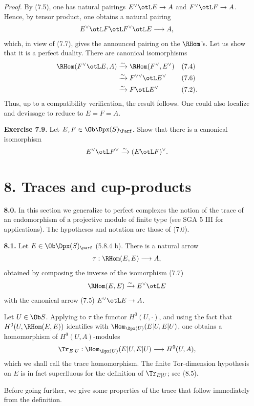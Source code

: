 \emph{Proof.} By (7.5), one has natural pairings \(E^\vee\otL E\to A\) and \(F^\vee\otL F\to A\). Hence, by tensor product, one obtains a natural pairing
\[
  E^\vee\otL F\otL F^\vee\otL E\longrightarrow A,
\]
which, in view of (7.7), gives the announced pairing on the \(\RHom\)'s. Let us show that it is a perfect duality. There are canonical isomorphisms
\[
\begin{aligned}
\RHom(F^\vee\otL E,A)&\xrightarrow{\sim}\RHom(F^\vee,E^\vee) &&(7.4)\\
&\xrightarrow{\sim} F^{\vee\vee}\otL E^\vee &&(7.6)\\
&\xrightarrow{\sim} F\otL E^\vee &&(7.2).
\end{aligned}
\]
Thus, up to a compatibility verification, the result follows. One could also localize and devissage to reduce to \(E=F=A\).


\textbf{Exercise 7.9.} Let \(E,F\in\Ob\Dpx(S)_{\Parf}\). Show that there is a canonical isomorphism
\[
  E^\vee\otL F^\vee \xrightarrow{\sim} (E\otL F)^\vee .
\]

\section*{8. Traces and cup-products}

\textbf{8.0.} In this section we generalize to perfect complexes the notion of the trace of an endomorphism of a projective module of finite type (see SGA 5 III for applications). The hypotheses and notation are those of (7.0).

\textbf{8.1.} Let \(E\in\Ob\Dpx(S)_{\parf}\) (5.8.4 b). There is a natural arrow
\[
  \tau:\RHom(E,E)\longrightarrow A,
\]
obtained by composing the inverse of the isomorphism (7.7)
\[
  \RHom(E,E)\xrightarrow{\sim}E^\vee\otL E
\]
with the canonical arrow (7.5) \(E^\vee\otL E\to A\).

Let \(U\in\Ob S\). Applying to \(\tau\) the functor \(H^0(U,\cdot)\), and using the fact that \(H^0(U,\RHom(E,E))\) identifies with \(\Hom_{\Dpx(U)}(E|U,E|U)\), one obtains a homomorphism of \(H^0(U,A)\)-modules
\[
  \Tr_{E|U}:\Hom_{\Dpx(U)}(E|U,E|U)\longrightarrow H^0(U,A),
\]
which we shall call the trace homomorphism. The finite Tor-dimension hypothesis on \(E\) is in fact superfluous for the definition of \(\Tr_{E|U}\); see (8.5).

Before going further, we give some properties of the trace that follow immediately from the definition.

